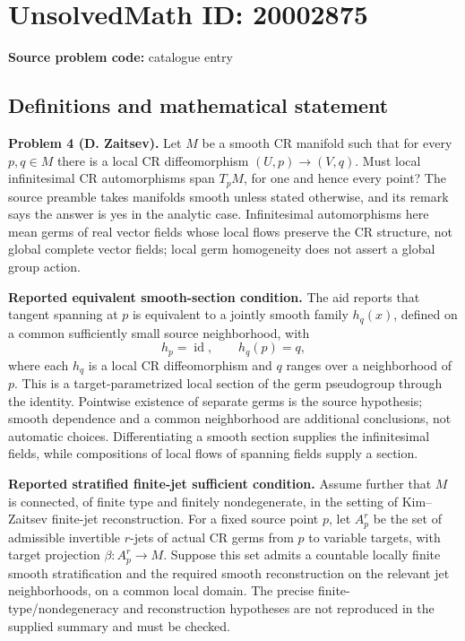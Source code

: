 \documentclass[11pt]{article}
\begin{document}
\section*{UnsolvedMath ID: 20002875}
\textbf{Source problem code:} catalogue entry
\subsection{Definitions and mathematical statement}
\textbf{Problem 4 (D. Zaitsev).} Let \(M\) be a smooth CR manifold such that for every \(p,q\in M\) there is a local CR diffeomorphism \((U,p)\to(V,q)\). Must local infinitesimal CR automorphisms span \(T_pM\), for one and hence every point? The source preamble takes manifolds smooth unless stated otherwise, and its remark says the answer is yes in the analytic case. Infinitesimal automorphisms here mean germs of real vector fields whose local flows preserve the CR structure, not global complete vector fields; local germ homogeneity does not assert a global group action.

\textbf{Reported equivalent smooth-section condition.} The aid reports that tangent spanning at \(p\) is equivalent to a jointly smooth family \(h_q(x)\), defined on a common sufficiently small source neighborhood, with
\[
 h_p=\operatorname{id},\qquad h_q(p)=q,
\]
where each \(h_q\) is a local CR diffeomorphism and \(q\) ranges over a neighborhood of \(p\). This is a target-parametrized local section of the germ pseudogroup through the identity. Pointwise existence of separate germs is the source hypothesis; smooth dependence and a common neighborhood are additional conclusions, not automatic choices. Differentiating a smooth section supplies the infinitesimal fields, while compositions of local flows of spanning fields supply a section.

\textbf{Reported stratified finite-jet sufficient condition.} Assume further that \(M\) is connected, of finite type and finitely nondegenerate, in the setting of Kim--Zaitsev finite-jet reconstruction. For a fixed source point \(p\), let \(A_p^r\) be the set of admissible invertible \(r\)-jets of actual CR germs from \(p\) to variable targets, with target projection \(\beta:A_p^r\to M\). Suppose this set admits a countable locally finite smooth stratification and the required smooth reconstruction on the relevant jet neighborhoods, on a common local domain. The precise finite-type/nondegeneracy and reconstruction hypotheses are not reproduced in the supplied summary and must be checked.
\end{document}

